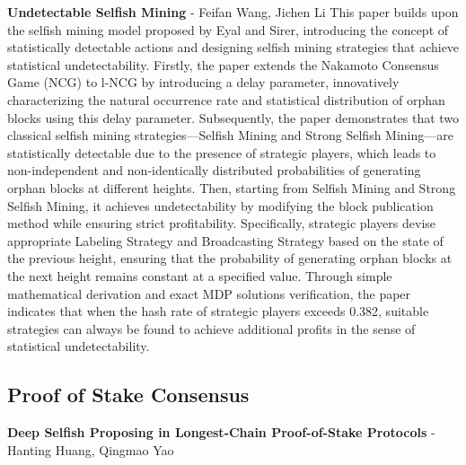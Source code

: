 \textbf{Undetectable Selfish Mining} - Feifan Wang, Jichen Li
\cite{bahrani2023undetectable}This paper builds upon the selfish mining model proposed by Eyal and Sirer\cite{eyal2014majority}, introducing the concept of statistically detectable actions and designing selfish mining strategies that achieve statistical undetectability. Firstly, the paper extends the Nakamoto Consensus Game (NCG) to l-NCG by introducing a delay parameter, innovatively characterizing the natural occurrence rate and statistical distribution of orphan blocks using this delay parameter. Subsequently, the paper demonstrates that two classical selfish mining strategies—Selfish Mining and Strong Selfish Mining—are statistically detectable due to the presence of strategic players, which leads to non-independent and non-identically distributed probabilities of generating orphan blocks at different heights. Then, starting from Selfish Mining and Strong Selfish Mining, it achieves undetectability by modifying the block publication method while ensuring strict profitability. Specifically, strategic players devise appropriate Labeling Strategy and Broadcasting Strategy based on the state of the previous height, ensuring that the probability of generating orphan blocks at the next height remains constant at a specified value. Through simple mathematical derivation and exact MDP solutions verification, the paper indicates that when the hash rate of strategic players exceeds 0.382, suitable strategies can always be found to achieve additional profits in the sense of statistical undetectability.


\subsection{Proof of Stake Consensus}
\textbf{Deep Selfish Proposing in Longest-Chain Proof-of-Stake Protocols} - Hanting Huang, Qingmao Yao

